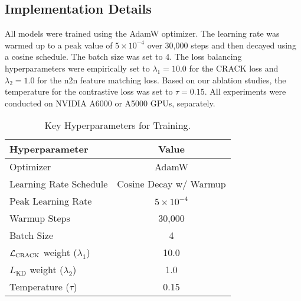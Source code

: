 \documentclass{article}
\begin{document}
\subsection{Implementation Details}
All models were trained using the AdamW optimizer. The learning rate was warmed up to a peak value of $5 \times 10^{-4}$ over 30,000 steps and then decayed using a cosine schedule. The batch size was set to 4. The loss balancing hyperparameters were empirically set to $\lambda_1=10.0$ for the CRACK loss and $\lambda_2=1.0$ for the n2n feature matching loss. Based on our ablation studies, the temperature for the contrastive loss was set to $\tau=0.15$. All experiments were conducted on NVIDIA A6000 or A5000 GPUs, separately.

\begin{table}[h]
\centering
\caption{Key Hyperparameters for Training.}
\label{tab:hyperparams}
\begin{adjustbox}{max width=0.7\textwidth}
\begin{tabular}{lc}
\toprule
\textbf{Hyperparameter} & \textbf{Value} \\
\midrule
Optimizer & AdamW \\
Learning Rate Schedule & Cosine Decay w/ Warmup \\
Peak Learning Rate & $5 \times 10^{-4}$ \\
Warmup Steps & 30,000 \\
Batch Size & 4 \\
$\mathcal{L}_{\text{CRACK}}$ weight ($\lambda_1$) & 10.0 \\
$L_{\text{KD}}$ weight ($\lambda_2$) & 1.0 \\
Temperature ($\tau$) & 0.15 \\
\bottomrule
\end{tabular}
\end{adjustbox}
\end{table}


\end{document}

